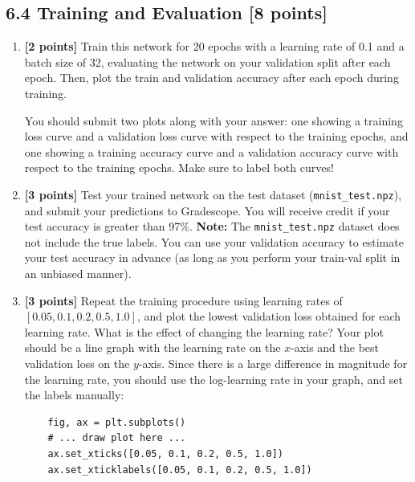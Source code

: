 \documentclass[a3paper,12pt]{extarticle} %
\begin{document}
\subsection*{6.4 Training and Evaluation [8 points]}
\begin{enumerate}
    \item \textbf{[2 points]} Train this network for 20 epochs with a learning rate of 0.1 and a batch size of 32, evaluating the network on your validation split after each epoch. Then, plot the train and validation accuracy after each epoch during training.
    
    You should submit two plots along with your answer: one showing a training loss curve and a validation loss curve with respect to the training epochs, and one showing a training accuracy curve and a validation accuracy curve with respect to the training epochs. Make sure to label both curves!

    \item \textbf{[3 points]} Test your trained network on the test dataset (\texttt{mnist\_test.npz}), and submit your predictions to Gradescope. You will receive credit if your test accuracy is greater than 97\%. \textbf{Note:} The \texttt{mnist\_test.npz} dataset does not include the true labels. You can use your validation accuracy to estimate your test accuracy in advance (as long as you perform your train-val split in an unbiased manner).

    \item \textbf{[3 points]} Repeat the training procedure using learning rates of $[0.05, 0.1, 0.2, 0.5, 1.0]$, and plot the lowest validation loss obtained for each learning rate. What is the effect of changing the learning rate? Your plot should be a line graph with the learning rate on the $x$-axis and the best validation loss on the $y$-axis. Since there is a large difference in magnitude for the learning rate, you should use the log-learning rate in your graph, and set the labels manually:
    \begin{verbatim}
    fig, ax = plt.subplots()
    # ... draw plot here ...
    ax.set_xticks([0.05, 0.1, 0.2, 0.5, 1.0])
    ax.set_xticklabels([0.05, 0.1, 0.2, 0.5, 1.0])
    \end{verbatim}
\end{enumerate}
\end{document}
